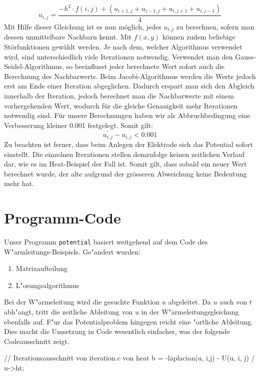 \begin{refsection}
\begin{equation}\label{eq:gleichung}
u_{i,j}=\dfrac{-h^{2}\cdot f(i,j)+(u_{i+1,j}+u_{i-1,j}+u_{i,j+1}+u_{i,j-1})}{4} 
\end{equation}
Mit Hilfe dieser Gleichung ist es nun m\"oglich, jedes $u_{i,j}$ zu
berechnen, sofern man dessen unmittelbare Nachbarn kennt. Mit $f(x,y)$
k\"onnen zudem beliebige St\"orfunktionen gew\"ahlt werden. Je nach
dem, welcher Algorithmus verwendet wird, sind unterschiedlich viele
Iterationen notwendig. Verwendet man den Gauss-Seidel-Algorithmus,
so beeinflusst jeder berechnete Wert sofort auch die Berechnung des
Nachbarwerts. Beim Jacobi-Algorithmus werden die Werte jedoch erst am
Ende einer Iteration abgeglichen. Dadurch erspart man sich den Abgleich
innerhalb der Iteration, jedoch berechnet man die Nachbarwerte mit
einem vorhergehenden Wert, wodurch f\"ur die gleiche Genauigkeit mehr
Iterationen notwendig sind.
F\"ur unsere Berechnungen haben wir als Abbruchbedingung eine Verbesserung
kleiner 0.001 festgelegt. Somit gilt:
\begin{equation*}
u^{'}_{i,j} - u_{i,j} < 0.001 
\end{equation*}
Zu beachten ist ferner, dass beim Anlegen der Elektrode sich das Potential
sofort einstellt. Die einzelnen Iterationen stellen demzufolge keinen
zeitlichen Verlauf dar, wie es im Heat-Beispiel der Fall ist. Somit
gilt, dass sobald ein neuer Wert berechnet wurde, der alte aufgrund der
gr\"osseren Abweichung keine Bedeutung mehr hat. 


\section{Programm-Code}	
Unser Programm \texttt{potential}  basiert  weitgehend  auf  dem  Code  des  W"armleitungs-Beispiels. Ge"andert wurden:
\begin{enumerate}
\item Matrixaufteilung
\item L"osungsalgorithmus
\end{enumerate}
Bei der W"armeleitung wird die gesuchte Funktion $u$ abgeleitet. Da
$u$ auch von $t$ abh"angt, tritt die zeitliche Ableitung von $u$ in
der W"armeleitungsgleichung ebenfalls auf. F"ur das Potentialproblem
hingegen reicht eine "ortliche Ableitung. Dies macht die Umsetzung in
Code wesentlich einfacher, was der folgende Codeausschnitt zeigt.
			
	\begin{code}
	// Iterationsausschnitt von iteration.c von heat
		b = -laplacian(u, i,j) - U(u, i, j) / u->ht;	\end{code}	
	

\end{refsection}
